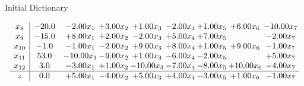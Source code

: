 \documentclass[8pt]{article}
\begin{document}
Initial Dictionary 

\[\begin{array}{c| c c@{\hskip 2pt} c@{\hskip 2pt} c@{\hskip 2pt} c@{\hskip 2pt} c@{\hskip 2pt} c@{\hskip 2pt} c@{\hskip 2pt} }
 x_{8}   &  -20.0 & -2.00 x_{1} & +  3.00 x_{2} & +  1.00 x_{3} & -2.00 x_{4} & +  1.00 x_{5} & +  6.00 x_{6} & -10.00 x_{7}\\
 x_{9}   &  -15.0 & +  8.00 x_{1} & +  2.00 x_{2} & -2.00 x_{3} & +  5.00 x_{4} & +  7.00 x_{5} &   & -2.00 x_{7}\\
 x_{10}   &  -1.0 & -1.00 x_{1} & -2.00 x_{2} & +  9.00 x_{3} & +  8.00 x_{4} & +  1.00 x_{5} & +  9.00 x_{6} & -1.00 x_{7}\\
 x_{11}   &  53.0 & -10.00 x_{1} & -9.00 x_{2} & +  1.00 x_{3} & -6.00 x_{4} & -2.00 x_{5} &   & +  5.00 x_{7}\\
 x_{12}   &  3.0 & -3.00 x_{1} & +  1.00 x_{2} & -10.00 x_{3} & -7.00 x_{4} & -8.00 x_{5} & + 10.00 x_{6} & -4.00 x_{7}\\
\hline
z    &  0.0 & +  5.00 x_{1} & -4.00 x_{2} & +  5.00 x_{3} & +  4.00 x_{4} & -3.00 x_{5} & +  1.00 x_{6} & -1.00 x_{7}\\
\end{array}\]
\end{document}
